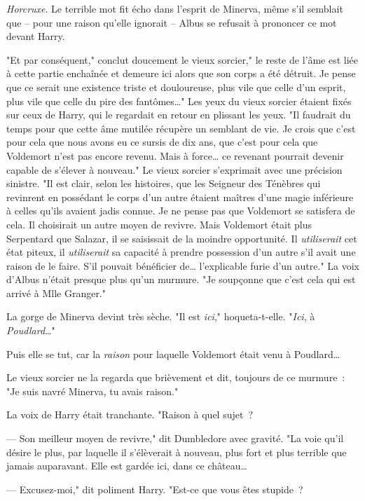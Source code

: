 \emph{Horcruxe}. Le terrible mot fit écho dans l'esprit de Minerva, même s'il semblait que -- pour une raison qu'elle ignorait -- Albus se refusait à prononcer ce mot devant Harry.

"Et par conséquent," conclut doucement le vieux sorcier," le reste de l'âme est liée à cette partie enchaînée et demeure ici alors que son corps a été détruit. Je pense que ce serait une existence triste et douloureuse, plus vile que celle d'un esprit, plus vile que celle du pire des fantômes…" Les yeux du vieux sorcier étaient fixés sur ceux de Harry, qui le regardait en retour en plissant les yeux. "Il faudrait du temps pour que cette âme mutilée récupère un semblant de vie. Je crois que c'est pour cela que nous avons eu ce sursis de dix ans, que c'est pour cela que Voldemort n'est pas encore revenu. Mais à force… ce revenant pourrait devenir capable de s'élever à nouveau." Le vieux sorcier s'exprimait avec une précision sinistre. "Il est clair, selon les histoires, que les Seigneur des Ténèbres qui revinrent en possédant le corps d'un autre étaient maîtres d'une magie inférieure à celles qu'ils avaient jadis connue. Je ne pense pas que Voldemort se satisfera de cela. Il choisirait un autre moyen de revivre. Mais Voldemort était plus Serpentard que Salazar, il se saisissait de la moindre opportunité. Il \emph{utiliserait} cet état piteux, il \emph{utiliserait} sa capacité à prendre possession d'un autre s'il avait une raison de le faire. S'il pouvait bénéficier de… l'explicable furie d'un autre." La voix d'Albus n'était presque plus qu'un murmure. "Je soupçonne que c'est cela qui est arrivé à Mlle Granger."

La gorge de Minerva devint très sèche. "Il est \emph{ici}," hoqueta-t-elle. "\emph{Ici}, à \emph{Poudlard}…"

Puis elle se tut, car la \emph{raison} pour laquelle Voldemort était venu à Poudlard…

Le vieux sorcier ne la regarda que brièvement et dit, toujours de ce murmure~: "Je suis navré Minerva, tu avais raison."

La voix de Harry était tranchante. "Raison à quel sujet~?

--- Son meilleur moyen de revivre," dit Dumbledore avec gravité. "La voie qu'il désire le plus, par laquelle il s'élèverait à nouveau, plus fort et plus terrible que jamais auparavant. Elle est gardée ici, dans ce château…

--- Excusez-moi," dit poliment Harry. "Est-ce que vous êtes stupide~?


